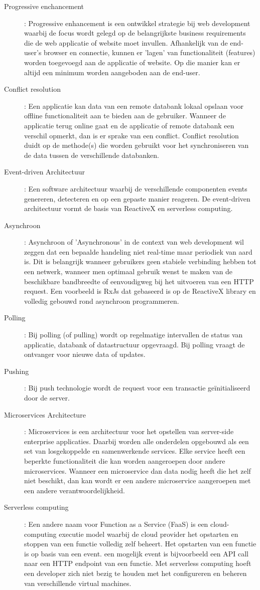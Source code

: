 \begin{description}
\item[Progressive enchancement]: Progressive enhancement is een ontwikkel strategie bij web development waarbij de focus wordt gelegd op de belangrijkste business requirements die de web applicatie of website moet invullen. Afhankelijk van de end-user's browser en connectie, kunnen er 'lagen' van functionaliteit (features) worden toegevoegd aan de applicatie of website. Op die manier kan er altijd een minimum worden aangeboden aan de end-user.
\item[Conflict resolution]: Een applicatie kan data van een remote databank lokaal opslaan voor offline functionaliteit aan te bieden aan de gebruiker. Wanneer de applicatie terug online gaat en de applicatie of remote databank een verschil opmerkt, dan is er sprake van een conflict. Conflict resolution duidt op de methode(s) die worden gebruikt voor het synchroniseren van de data tussen de verschillende databanken.
\item[Event-driven Architectuur]: Een software architectuur waarbij de verschillende componenten events genereren, detecteren en op een gepaste manier reageren. De event-driven architectuur vormt de basis van ReactiveX en serverless computing.
\item[Asynchroon]: Asynchroon of 'Asynchronous' in de context van web development wil zeggen dat een bepaalde handeling niet real-time maar periodiek van aard is. Dit is belangrijk wanneer gebruikers geen stabiele verbinding hebben tot een netwerk, wanneer men optimaal gebruik wenst te maken van de beschikbare bandbreedte of eenvoudigweg bij het uitvoeren van een HTTP request. Een voorbeeld is RxJs dat gebaseerd is op de ReactiveX library en volledig gebouwd rond asynchroon programmeren.
\item[Polling]: Bij polling (of pulling) wordt op regelmatige intervallen de status van applicatie, databank of datastructuur opgevraagd. Bij polling vraagt de ontvanger voor nieuwe data of updates.
\item[Pushing]: Bij push technologie wordt de request voor een transactie ge\"initialiseerd door de server.
\item[Microservices Architecture]: Microservices is een architectuur voor het opstellen van server-side enterprise applicaties. Daarbij worden alle onderdelen opgebouwd als een set van losgekoppelde en samenwerkende services. Elke service heeft een beperkte functionaliteit die kan worden aangeroepen door andere microservices. Wanneer een microservice dan data nodig heeft die het zelf niet beschikt, dan kan wordt er een andere microservice aangeroepen met een andere verantwoordelijkheid.
\item[Serverless computing]: Een andere naam voor Function as a Service (FaaS) is een cloud-computing executie model waarbij de cloud provider het opstarten en stoppen van een functie volledig zelf beheert. Het opstarten van een functie is op basis van een event. een mogelijk event is bijvoorbeeld een API call naar een HTTP endpoint van een functie. Met serverless computing hoeft een developer zich niet bezig te houden met het configureren en beheren van verschillende virtual machines.
\end{description}